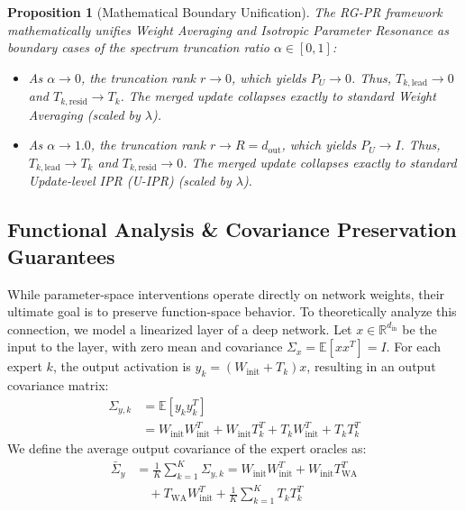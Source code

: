 \documentclass{article}
\theoremstyle{plain}
\newtheorem{proposition}[theorem]{Proposition}
\theoremstyle{definition}
\theoremstyle{remark}
\begin{document}
\begin{proposition}[Mathematical Boundary Unification]
The RG-PR framework mathematically unifies Weight Averaging and Isotropic Parameter Resonance as boundary cases of the spectrum truncation ratio $\alpha \in [0, 1]$:
\begin{itemize}
    \item As $\alpha \to 0$, the truncation rank $r \to 0$, which yields $P_U \to 0$. Thus, $T_{k, \text{lead}} \to 0$ and $T_{k, \text{resid}} \to T_k$. The merged update collapses exactly to standard Weight Averaging (scaled by $\lambda$).
    \item As $\alpha \to 1.0$, the truncation rank $r \to R = d_{\text{out}}$, which yields $P_U \to I$. Thus, $T_{k, \text{lead}} \to T_k$ and $T_{k, \text{resid}} \to 0$. The merged update collapses exactly to standard Update-level IPR (U-IPR) (scaled by $\lambda$).
\end{itemize}
\end{proposition}

\subsection{Functional Analysis \& Covariance Preservation Guarantees}
While parameter-space interventions operate directly on network weights, their ultimate goal is to preserve function-space behavior. To theoretically analyze this connection, we model a linearized layer of a deep network. Let $x \in \mathbb{R}^{d_{\text{in}}}$ be the input to the layer, with zero mean and covariance $\Sigma_x = \mathbb{E}[x x^T] = I$. For each expert $k$, the output activation is $y_k = (W_{\text{init}} + T_k) x$, resulting in an output covariance matrix:
\begin{equation}
    \begin{aligned}
        \Sigma_{y, k} &= \mathbb{E}[y_k y_k^T] \\
        &= W_{\text{init}} W_{\text{init}}^T + W_{\text{init}} T_k^T + T_k W_{\text{init}}^T + T_k T_k^T
    \end{aligned}
\end{equation}
We define the average output covariance of the expert oracles as:
\begin{equation}
    \begin{aligned}
        \bar{\Sigma}_{y} &= \frac{1}{K} \sum_{k=1}^K \Sigma_{y, k} = W_{\text{init}} W_{\text{init}}^T + W_{\text{init}} T_{\text{WA}}^T \\
        &\quad + T_{\text{WA}} W_{\text{init}}^T + \frac{1}{K} \sum_{k=1}^K T_k T_k^T
    \end{aligned}
\end{equation}
\end{document}
